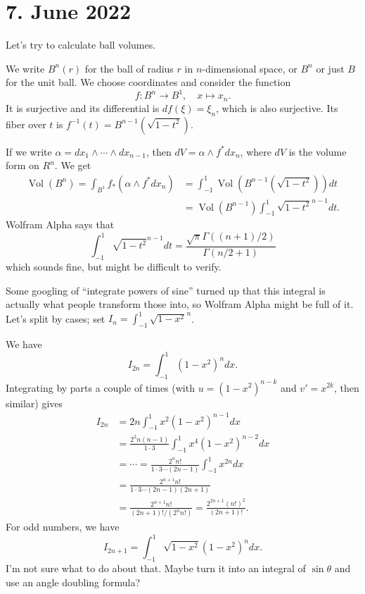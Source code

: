 \documentclass[11pt]{article}
\theoremstyle{definition}
\DeclareMathOperator{\Vol}{Vol}
\begin{document}
\section*{7. June 2022}

Let's try to calculate ball volumes.

We write $B^{n}(r)$ for the ball of radius $r$ in $n$-dimensional space, or $B^{n}$ or just $B$ for the unit ball. We choose coordinates and consider the function
\[
  f : B^{n} \to B^{1},\quad
  x \mapsto x_{n}.
\]
It is surjective and its differential is $df(\xi) = \xi_{n}$, which is also surjective. Its fiber over $t$ is $f^{-1}(t) = B^{n-1}(\sqrt{1-t^{2}})$.

If we write $\alpha = dx_{1} \wedge \cdots \wedge dx_{n-1}$, then $dV = \alpha \wedge f^{*} dx_{n}$, where $dV$ is the volume form on $R^{n}$. We get
\begin{align*}
  \Vol(B^{n})
  = \int_{B^{1}} f_{*}(\alpha \wedge f^{*}dx_{n})
  &= \int_{-1}^{1} \Vol(B^{n-1}(\sqrt{1-t^{2}})) dt
    \\
  &= \Vol(B^{n-1})\int_{-1}^{1}\sqrt{1-t^{2}}^{n-1} dt.
\end{align*}
Wolfram Alpha says that
$$
\int_{-1}^{1}\sqrt{1-t^{2}}^{n-1} dt
= \frac{\sqrt\pi \Gamma((n+1)/2)}{\Gamma(n/2 + 1)}
$$
which sounds fine, but might be difficult to verify.

Some googling of ``integrate powers of sine'' turned up that this integral is actually what people transform those into, so Wolfram Alpha might be full of it.
Let's split by cases; set $I_{n} = \int_{-1}^{1}\sqrt{1-x^{2}}^{n}$.

We have
$$
I_{2n} = \int_{-1}^{1}(1-x^{2})^{n} dx.
$$
Integrating by parts a couple of times (with $u = (1-x^{2})^{n-k}$ and $v' = x^{2k}$, then similar) gives
\begin{align*}
I_{2n}
&= 2n \int_{-1}^{1} x^{2} (1-x^{2})^{n-1} dx
\\
&= \frac{2^{2} n(n-1)}{1 \cdot 3} \int_{-1}^{1} x^4 (1-x^{2})^{n-2} dx
\\
&= \cdots =
\frac{2^{n} n!}{1 \cdot 3 \cdots (2n-1)} \int_{-1}^{1} x^{2n} dx
\\
&= \frac{2^{n+1} n!}{1 \cdot 3 \cdots (2n-1)(2n+1)}
\\
&= \frac{2^{n+1} n!}{(2n+1)!/(2^{n}n!)}
= \frac{2^{2n+1} (n!)^{2}}{(2n+1)!}.
\end{align*}
For odd numbers, we have
\[
I_{2n+1} = \int_{-1}^{1} \sqrt{1-x^{2}} (1-x^{2})^{n} dx.
\]
I'm not sure what to do about that. Maybe turn it into an integral of $\sin \theta$ and use an angle doubling formula?
\end{document}
